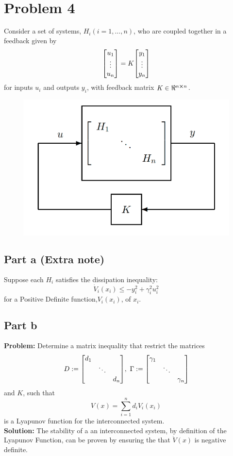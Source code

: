 \documentclass[letter]{article}
\begin{document}
\newpage
\newpage
\section{Problem 4}
Consider a set of systems, $H_i (i=1,\dots,n)$, who are coupled together in a feedback given by
$$\mqty[u_1\\ \vdots \\ u_n] = K \mqty[y_1\\ \vdots \\ y_n]$$
for inputs $u_i$ and outputs $y_i$, with feedback matrix $K \in \real^{n\cross n}$.

\begin{figure}[h]
	\centering
	\includegraphics[width=0.5\linewidth]{fig/pblm4_given_fig}
	\label{fig:pblm4givenfig}
\end{figure}

\subsection{Part a (Extra note)}
Suppose each $H_i$ satisfies the dissipation inequality:
$$\dot{V}_i(x_i) \leq -y_i^2 + \gamma_i^2 u_i^2$$
for a Positive Definite function,$V_i(x_i)$, of $x_i$.\\

\newpage
\subsection{Part b}
\textbf{Problem:}
Determine a matrix inequality that restrict the matrices
$$D := \mqty[\dmat{d_1}{\ddots}{d_n}], \ \Gamma := \mqty[\dmat{\gamma_1}{\ddots}{\gamma_n}]$$
and $K$, such that $$V(x) = \sum_{i=1}^{n} d_i V_i(x_i)$$ is a Lyapunov function for the interconnected system.\\

\noindent
\textbf{Solution:}
The stability of a an interconnected system, by definition of the Lyapunov Function, can be proven by ensuring the that $\dot{V}(x)$ is negative definite.
\end{document}
